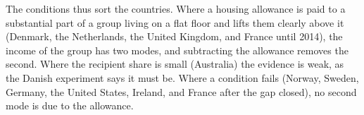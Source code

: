 The conditions thus sort the countries. Where a housing allowance is paid to a substantial part of a group living on a flat floor and lifts them clearly above it (Denmark, the Netherlands, the United Kingdom, and France until 2014), the income of the group has two modes, and subtracting the allowance removes the second. Where the recipient share is small (Australia) the evidence is weak, as the Danish experiment says it must be. Where a condition fails (Norway, Sweden, Germany, the United States, Ireland, and France after the gap closed), no second mode is due to the allowance.